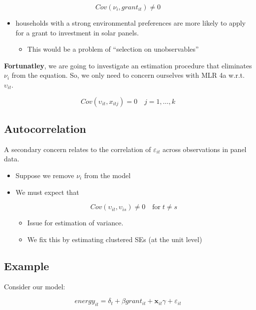 \documentclass[
  letterpaper,
  DIV=11,
  numbers=noendperiod]{scrartcl}
\providecommand{\tightlist}{%
  \setlength{\itemsep}{0pt}\setlength{\parskip}{0pt}}
\begin{document}
\[
  Cov(\nu_{i}, grant_{it}) \neq 0
\]

\begin{itemize}
\item
  households with a strong environmental preferences are more likely to
  apply for a grant to investment in solar panels.

  \begin{itemize}
  \tightlist
  \item
    This would be a problem of ``selection on unobservables''
  \end{itemize}
\end{itemize}

\textbf{Fortunatley}, we are going to investigate an estimation
procedure that eliminates \(\nu_i\) from the equation. So, we only need
to concern ourselves with MLR 4a w.r.t. \(\upsilon_{it}\).

\[
  Cov(\upsilon_{it}, x_{itj}) = 0 \quad j=1,\dots,k
\]

\subsection{Autocorrelation}\label{autocorrelation}

A secondary concern relates to the correlation of \(\varepsilon_{it}\)
across observations in panel data.

\begin{itemize}
\item
  Suppose we remove \(\nu_{i}\) from the model
\item
  We must expect that

  \[
    Cov(\upsilon_{it},\upsilon_{is}) \neq 0 \quad \text{for}\; t\neq s
  \]

  \begin{itemize}
  \tightlist
  \item
    Issue for estimation of variance.
  \item
    We fix this by estimating clustered SEs (at the unit level)
  \end{itemize}
\end{itemize}

\subsection{Example}\label{example}

Consider our model:

\[
  energy_{it} = \delta_t + \beta grant_{it} + \mathbf{x}_{it}\gamma + \varepsilon_{it}
\]
\end{document}
